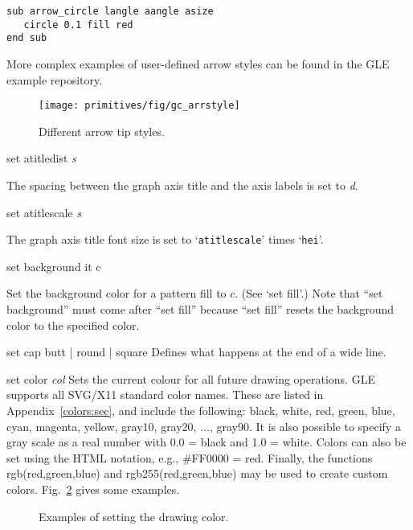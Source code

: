\begin{commanddescription}
\begin{Verbatim}
sub arrow_circle langle aangle asize
   circle 0.1 fill red
end sub
\end{Verbatim}

\noindent{}More complex examples of user-defined arrow styles can be found in the GLE example repository.

\begin{figure}
\centering
\texttt{[image: primitives/fig/gc\_arrstyle]}
\caption{\label{arrsty:fig}Different arrow tip styles.}
\end{figure}

\item[{\sf set atitledist {\it s}}]

The spacing between the graph axis title and the axis labels is set to {\it d}.

\item[{\sf set atitlescale {\it s}}]

The graph axis title font size is set to `\texttt{atitlescale}' times `\texttt{hei}'.

\item[{\sf set background {it c}}]

Set the background color for a pattern fill to $c$. (See `set fill'.) Note that ``set background'' must come after ``set fill'' because ``set fill'' resets the background color to the specified color.

\item[{\sf set cap {\sf butt | round | square}}]
Defines what happens at the end of a wide line.


\item[{\sf set color {\it col}}]
\label{scol:cmd}
Sets the current colour for all future drawing operations. GLE supports all SVG/X11 standard color names. These are listed in Appendix~\ref{colors:sec}, and include the following: black, white, red, green, blue, cyan, magenta, yellow, gray10, gray20, $\ldots$, gray90. It is also possible to specify a gray scale as a real number with 0.0 = black and 1.0 = white. Colors can also be set using the HTML notation, e.g., \#FF0000 = red. Finally, the functions rgb(red,green,blue) and rgb255(red,green,blue) may be used to create custom colors. Fig.~\ref{colex:fig} gives some examples.

\begin{figure}
\centering
\mbox{}
\caption{\label{colex:fig}Examples of setting the drawing color.}
\end{figure}


\end{commanddescription}
